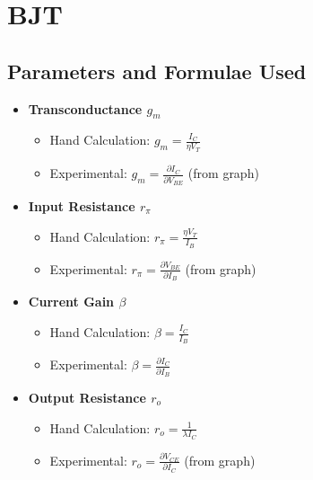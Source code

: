 \documentclass{article}
\begin{document}
\section{BJT}
\subsection*{Parameters and Formulae Used}

\begin{itemize}
    \item \textbf{Transconductance $g_m$}
    \begin{itemize}
        \item Hand Calculation: $g_m = \frac{I_C}{\eta V_T}$
        \item Experimental: $g_m = \frac{\partial I_C}{\partial V_{BE}}$ (from graph)
    \end{itemize}
    \item \textbf{Input Resistance $r_\pi$}
    \begin{itemize}
        \item Hand Calculation: $r_\pi = \frac{\eta V_T}{I_B}$
        \item Experimental: $r_\pi = \frac{\partial V_{BE}}{\partial I_B}$ (from graph)
    \end{itemize}

    \item \textbf{Current Gain $\beta$}
    \begin{itemize}
        \item Hand Calculation: $\beta = \frac{I_C}{I_B}$
        \item Experimental: $\beta = \frac{\partial{I_C}}{\partial{I_B}}$
    \end{itemize}

    \item \textbf{Output Resistance $r_o$}
    \begin{itemize}
        \item Hand Calculation: $r_o = \frac{1}{\lambda I_C}$
        \item Experimental: $r_o = \frac{\partial V_{CE}}{\partial I_C}$ (from graph)
    \end{itemize}
\end{itemize}
\end{document}
